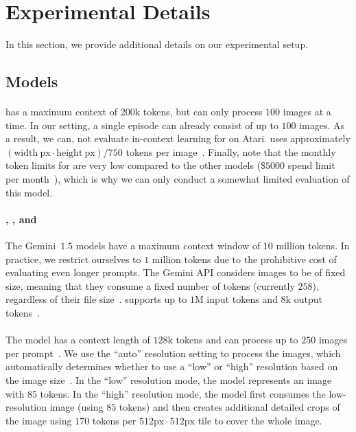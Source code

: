 \section{Experimental Details}
\label{app:experimental-details}

In this section, we provide additional details on our experimental setup.

\subsection{Models}
\label{app:experimental-details:models}

\paragraph{\claude{}}

\claude{} has a maximum context of $200$k tokens, but can only process $100$ images at a time. In our setting, a single episode can already consist of up to $100$ images.
As a result, we can, \eg not evaluate in-context learning for \claude{} on Atari.
\claude{} uses approximately $(\mathrm{width~px} \cdot \mathrm{height~px}) / 750$ tokens per image~\citep{anthropic2024vision}.
Finally, note that the monthly token limits for \claude{} are very low compared to the other models (\$$5000$ spend limit per month~\citep{anthropic2024rate}), which is why we can only conduct a somewhat limited evaluation of this model.

\paragraph{\flash{}, \pro{}, and \expflash{}}

The Gemini~$1.5$ models have a maximum context window of $10$ million tokens.
In practice, we restrict ourselves to $1$ million tokens due to the prohibitive cost of evaluating even longer prompts.
The Gemini API considers images to be of fixed size, meaning that they consume a fixed number of tokens (currently $258$), regardless of their file size~\citep{google2024understand}.
\expflash{} supports up to $1$M input tokens and $8$k output tokens~\citep{google2024flash}.

\paragraph{\gpt{}}

The \gpt{} model has a context length of $128$k tokens and can process up to $250$ images per prompt~\citep{openai2024models}.
We use the ``auto'' resolution setting to process the images, which automatically determines whether to use a ``low'' or ``high'' resolution based on the image size~\citep{openai2024vision}.
In the ``low'' resolution mode, the model represents an image with $85$ tokens.
In the ``high'' resolution mode, the model first consumes the low-resolution image (using $85$ tokens) and then creates additional detailed crops of the image using $170$ tokens per $512\mathrm{px} \cdot 512\mathrm{px}$ tile to cover the whole image.

